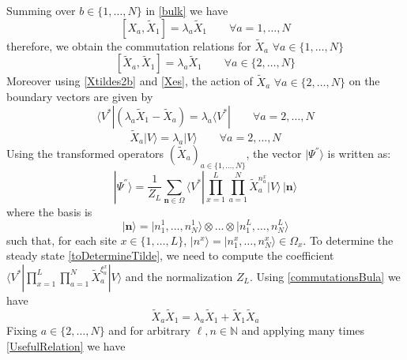 \documentclass[10pt]{article}
\numberwithin{equation}{section}
\numberwithin{equation}{subsection}
\newcommand{\Xt}{\tilde{X}}
\begin{document}
Summing over $b\in \{1,\ldots,N\}$ in \eqref{bulk} we have
\begin{equation} 
	\left[X_{a},\Xt_{1}\right]=\lambda_{a}\Xt_{1}\qquad\forall a=1,\ldots,N
\end{equation}
therefore, we obtain the commutation relations for $\Xt_{a}$ $\forall a\in \{1,\ldots,N\}$
\begin{equation}\label{commutationsBula}
	\left[\Xt_{a},\Xt_{1}\right]=\lambda_{a}\Xt_{1}\qquad \forall a\in \{2,\ldots,N\}
\end{equation}
Moreover using \eqref{Xtildes2b} and \eqref{Xes}, the action of $\Xt_{a}$ $\forall a\in \{2,\ldots,N\}$ on the boundary vectors are given by 
\begin{equation}\label{commLEFT}
	\langle V^{*}|\left(\lambda_{a}\Xt_{1}-\Xt_{a}\right)=\lambda_{a}\langle V^{*}|\qquad\forall a=2,\ldots,N
\end{equation}
\begin{equation}\label{commRIGHT}
	\Xt_{a} |V\rangle= \lambda_{a}|V\rangle\qquad\forall a=2,\ldots,N
\end{equation} 
Using the transformed operators $(\widetilde{X}_{a})_{a\in\{1,\ldots,N\}}$, the vector $|\Psi^{''}\rangle$ is written as:
\begin{equation}\label{toDetermineTilde}
	|\Psi^{''}\rangle = \frac{1}{Z_{L}}\sum_{\bm{n}\in \Omega}\langle V^{*}|\prod_{x=1}^{L}\prod_{a=1}^{N}\widetilde{X}_{a}^{n_{a}^{x}}
	|V \rangle \,|\bm{n}\rangle
\end{equation}
where the basis is 
$$
|\bm{n}\rangle =|n_{1}^{1},\ldots,n_{N}^{1}\rangle \otimes \ldots\otimes |n_{1}^{L},\ldots,n_{N}^{L}\rangle
$$
such that, for each site $x\in \{1,\ldots,L\}$, $|n^{x}\rangle=|n_{1}^{x},\ldots,n_{N}^{x}\rangle\in \Omega_{x}$. 
To determine the steady state \eqref{toDetermineTilde}, we need to compute the coefficient $\langle V^{*}|\prod_{x=1}^{L}\prod_{a=1}^{N}\widetilde{X}_{a}^{\xi_{a}^{x}}
|V \rangle$ and the normalization $Z_{L}$. Using \eqref{commutationsBula} we have
\begin{equation}\label{UsefulRelation}
	\widetilde{X}_{a}\widetilde{X}_{1}=\lambda_{a}\widetilde{X}_{1}+\widetilde{X}_{1}\widetilde{X}_{a}
\end{equation}
Fixing $ a\in \{2,\ldots,N\}$ and for arbitrary $ \ell,n\in \mathbb{N}$ and applying many times \eqref{UsefulRelation} we have
\end{document}
